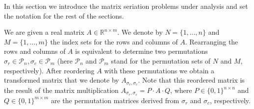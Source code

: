\documentclass[a4paper,11pt, reqno]{amsart}
\def\Per{\mathcal{P}}
\def\R{\mathbb{R}}
\begin{document}
In this section we introduce the matrix seriation problems under analysis and set the notation for the rest of the sections.

We are given a real matrix $A \in \R^{n\times m}$. We denote by $N=\{1, \ldots, n\}$ and $M=\{1, \ldots, m\}$ the index sets for the rows and columns of $A$. Rearranging the rows and columns of $A$ is equivalent to determine two permutations $\sigma_r \in \Per_n, \sigma_c \in \Per_m$ (here $\Per_n$ and $\Per_m$ stand for the permutation sets of $N$ and $M$, respectively). After reordering $A$ with these permutations we obtain a transformed matrix that we denote by $A_{\sigma_r,\sigma_c}$. Note that this reordered matrix is the result of the matrix multiplication $A_{\sigma_r,\sigma_c} = P\cdot A \cdot Q$, where $P \in \{0,1\}^{n\times n}$ and $Q \in \{0,1\}^{m\times m}$ are the permutation matrices derived from $\sigma_r$ and $\sigma_c$, respectively.
\end{document}
